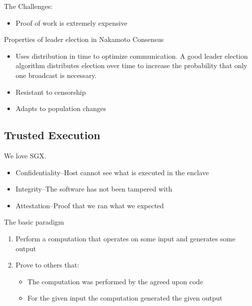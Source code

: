 The Challenges:
\begin{itemize}
\item Proof of work is extremely expensive
\end{itemize}

Properties of leader election in Nakamoto Consensus
\begin{itemize}
\item Uses distribution in time to optimize communication. A good leader
  election algorithm distributes election over time to increase the
  probability that only one broadcast is necessary.
\item Resistant to censorship
\item Adapts to population changes
\end{itemize}

\subsection{Trusted Execution}
We love SGX.

\begin{itemize}
\item Confidentiality--Host cannot see what is executed in the enclave
\item Integrity--The software has not been tampered with
\item Attestation--Proof that we ran what we expected
\end{itemize}

The basic paradigm
\begin{enumerate}
\item Perform a computation that operates on some input and generates some output
\item Prove to others that:
\begin{itemize}
\item The computation was performed by the agreed upon code
\item For the given input the computation generated the given output
\end{itemize}
\end{enumerate}
